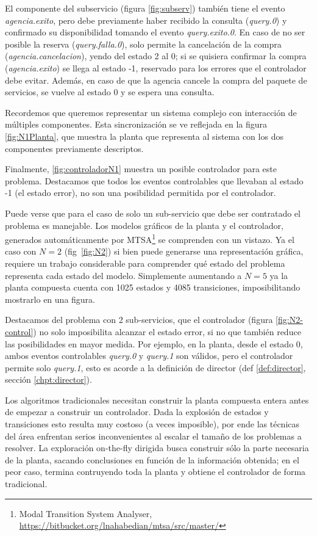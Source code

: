 El componente del subservicio (figura \ref{fig:subserv}) también tiene el evento \textit{agencia.exito}, pero debe previamente haber recibido la consulta (\textit{query.0}) y confirmado su disponibilidad tomando el evento \textit{query.exito.0}. En caso de no ser posible la reserva (\textit{query.falla.0}), solo permite la cancelación de la compra (\textit{agencia.cancelacion}), yendo del estado 2 al 0; si se quisiera confirmar la compra (\textit{agencia.exito}) se llega al estado -1, reservado para los errores que el controlador debe evitar. Además, en caso de que la agencia cancele la compra del paquete de servicios, se vuelve al estado 0 y se espera una consulta.

Recordemos que queremos representar un sistema complejo con interacción de múltiples componentes. Esta sincronización se ve reflejada en la figura \ref{fig:N1Planta}, que muestra la planta que representa al sistema con los dos componentes previamente descriptos. 

Finalmente, \ref{fig:controladorN1} muestra un posible controlador para este problema. Destacamos que todos los eventos controlables que llevaban al estado -1 (el estado error), no son una posibilidad permitida por el controlador. 

Puede verse que para el caso de solo un sub-servicio que debe ser contratado el problema es manejable. Los modelos gráficos de la planta y el controlador, generados automáticamente por MTSA\footnote{Modal Transition System Analyser, \href{https://bitbucket.org/lnahabedian/mtsa/src/master/^}{https://bitbucket.org/lnahabedian/mtsa/src/master/}} se comprenden con un vistazo. Ya el caso con $N=2$ (fig~\ref{fig:N2}) si bien puede generarse una representación gráfica, requiere un trabajo considerable para comprender qué estado del problema representa cada estado del modelo. Simplemente aumentando a $N=5$ ya la planta compuesta cuenta con 1025 estados y 4085 transiciones, imposibilitando mostrarlo en una figura. 

Destacamos del problema con 2 sub-servicios, que el controlador (figura \ref{fig:N2-control}) no solo imposibilita alcanzar el estado error, si no que también reduce las posibilidades en mayor medida. Por ejemplo, en la planta, desde el estado 0, ambos eventos controlables \textit{query.0} y \textit{query.1} son válidos, pero el controlador permite solo \textit{query.1}, esto es acorde a la definición de director (def \ref{def:director}, sección \ref{chpt:director}).

Los algoritmos tradicionales necesitan construir la planta compuesta entera antes de empezar a construir un controlador. Dada la explosión de estados y transiciones esto resulta muy costoso (a veces imposible), por ende las técnicas del área enfrentan serios inconvenientes al escalar el tamaño de los problemas a resolver. La exploración on-the-fly dirigida busca construir sólo la parte  necesaria de la planta, sacando conclusiones en función de la información obtenida; en el peor caso, termina contruyendo toda la planta y obtiene el controlador de forma tradicional.








